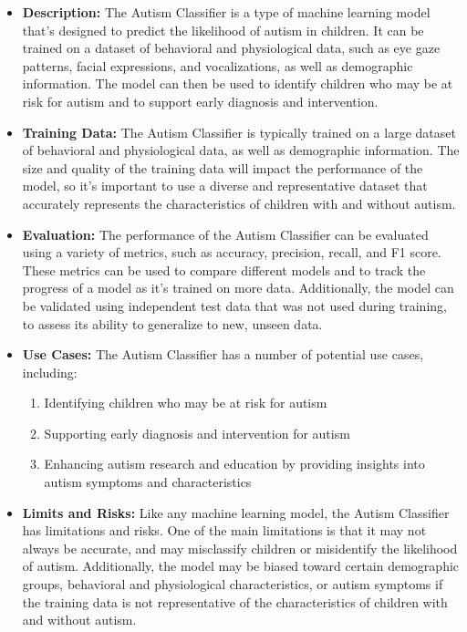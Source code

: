 \begin{itemize}
    \item \textbf{Description:} The Autism Classifier is a type of machine learning model that's designed to predict the likelihood of autism in children. It can be trained on a dataset of behavioral and physiological data, such as eye gaze patterns, facial expressions, and vocalizations, as well as demographic information. The model can then be used to identify children who may be at risk for autism and to support early diagnosis and intervention.
    \item \textbf{Training Data:} The Autism Classifier is typically trained on a large dataset of behavioral and physiological data, as well as demographic information. The size and quality of the training data will impact the performance of the model, so it's important to use a diverse and representative dataset that accurately represents the characteristics of children with and without autism.
    \item \textbf{Evaluation:} The performance of the Autism Classifier can be evaluated using a variety of metrics, such as accuracy, precision, recall, and F1 score. These metrics can be used to compare different models and to track the progress of a model as it's trained on more data. Additionally, the model can be validated using independent test data that was not used during training, to assess its ability to generalize to new, unseen data.
    \item \textbf{Use Cases:} The Autism Classifier has a number of potential use cases, including:
        \begin{enumerate}  
            \item Identifying children who may be at risk for autism
            \item Supporting early diagnosis and intervention for autism
            \item Enhancing autism research and education by providing insights into autism symptoms and characteristics
        \end{enumerate}
    \item \textbf{Limits and Risks:} Like any machine learning model, the Autism Classifier has limitations and risks. One of the main limitations is that it may not always be accurate, and may misclassify children or misidentify the likelihood of autism. Additionally, the model may be biased toward certain demographic groups, behavioral and physiological characteristics, or autism symptoms if the training data is not representative of the characteristics of children with and without autism.

\end{itemize}
